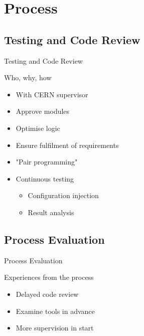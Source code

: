 \documentclass{beamer}
\begin{document}
\section{Process}
\subsection{Testing and Code Review}
\begin{frame}{Testing and Code Review}
\begin{block}{Who, why, how}
\begin{itemize}
    \item With CERN supervisor
    \item Approve modules
    \item Optimise logic
    \item Ensure fulfilment of requirements
    \item "Pair programming"
    \item Continuous testing
    \begin{itemize}
        \item Configuration injection
        \item Result analysis
    \end{itemize}
\end{itemize}
\end{block}
\end{frame}


\subsection{Process Evaluation}
\begin{frame}{Process Evaluation}
\begin{block}{Experiences from the process}
\begin{itemize}
    \item Delayed code review
    \item Examine tools in advance
    \item More supervision in start
\end{itemize}
\end{block}
\end{frame}
\end{document}
